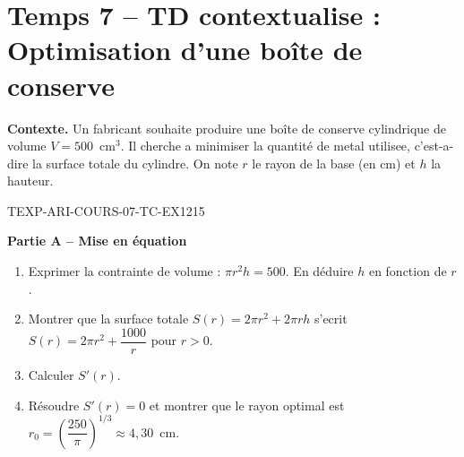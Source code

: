 

\section*{Temps 7 -- TD contextualise : Optimisation d'une boîte de conserve}

\textbf{Contexte.} Un fabricant souhaite produire une boîte de conserve cylindrique de volume $V = 500$~cm$^3$. Il cherche a minimiser la quantité de metal utilisee, c'est-a-dire la surface totale du cylindre. On note $r$ le rayon de la base (en cm) et $h$ la hauteur.

\bigskip


\begin{exercice}{TEXP-ARI-COURS-07-TC-EX1}{2}{15}

\textbf{Partie A -- Mise en équation}

\begin{enumerate}
  \item Exprimer la contrainte de volume : $\pi r^2 h = 500$. En déduire $h$ en fonction de $r$.
  \item Montrer que la surface totale $S(r) = 2\pi r^2 + 2\pi r h$ s'ecrit $S(r) = 2\pi r^2 + \dfrac{1000}{r}$ pour $r > 0$.
  \item Calculer $S'(r)$.
  \item Résoudre $S'(r) = 0$ et montrer que le rayon optimal est $r_0 = \left(\dfrac{250}{\pi}\right)^{1/3} \approx 4{,}30$~cm.
\end{enumerate}

\end{exercice}

